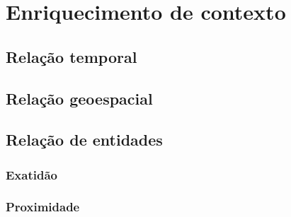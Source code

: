 \chapter{Enriquecimento de contexto}

\section{Relação temporal}
\section{Relação geoespacial}
\section{Relação de entidades}
\subsection{Exatidão}
\subsection{Proximidade}